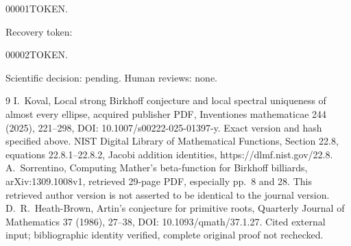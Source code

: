 \documentclass[10pt]{article}
\begin{document}
00001TOKEN.\par
Recovery token:\par
00002TOKEN.\par
Scientific decision: pending. Human reviews: none.\par
9 I. Koval, Local strong Birkhoff conjecture and local spectral uniqueness of almost every ellipse, acquired publisher PDF, Inventiones mathematicae 244 (2025), 221–298, DOI: 10.1007/s00222-025-01397-y. Exact version and hash specified above. NIST Digital Library of Mathematical Functions, Section 22.8, equations 22.8.1–22.8.2, Jacobi addition identities, https://dlmf.nist.gov/22.8. A. Sorrentino, Computing Mather’s beta-function for Birkhoff billiards, arXiv:1309.1008v1, retrieved 29-page PDF, especially pp. 8 and 28. This retrieved author version is not asserted to be identical to the journal version. D. R. Heath-Brown, Artin’s conjecture for primitive roots, Quarterly Journal of Mathematics 37 (1986), 27–38, DOI: 10.1093/qmath/37.1.27. Cited external input; bibliographic identity verified, complete original proof not rechecked.\par
\end{document}
